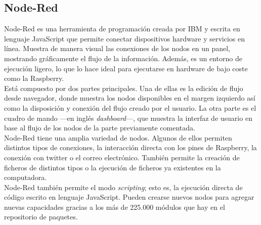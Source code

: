 \subsection{Node-Red}
\label{sec:nodered}
Node-Red es una herramienta de programación creada por IBM y escrita en lenguaje JavaScript que permite conectar dispositivos hardware y servicios en línea. Muestra de manera visual las conexiones de los nodos en un panel, mostrando gráficamente el flujo de la información. Además, es un entorno de ejecución ligero, lo que lo hace ideal para ejecutarse en hardware de bajo coste como la Raspberry.\\

Está compuesto por dos partes principales. Una de ellas es la edición de flujo desde navegador, donde muestra los nodos disponibles en el margen izquierdo así como la disposición y conexión del flujo creado por el usuario. La otra parte es el cuadro de mando ---en inglés \textit{dashboard}---, que muestra la interfaz de usuario en base al flujo de los nodos de la parte previamente comentada.\\

Node-Red tiene una amplia variedad de nodos. Algunos de ellos permiten distintos tipos de conexiones, la interacción directa con los pines de Raspberry, la conexión con twitter o el correo electrónico. También permite la creación de ficheros de distintos tipos o la ejecución de ficheros ya existentes en la computadora.\\

Node-Red también permite el modo \textit{scripting}; esto es, la ejecución directa de código escrito en lenguaje JavaScript. Pueden crearse nuevos nodos para agregar nuevas capacidades gracias a los más de 225.000 módulos que hay en el repositorio de paquetes.\\

